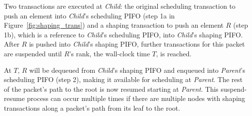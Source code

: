 Two transactions are executed at {\em Child}: the original scheduling
transaction to push an element into {\em Child}'s scheduling PIFO (step 1a
in Figure~\ref{fig:shaping_trans}) and a shaping transaction to push an
element $R$ (step 1b), which is a reference to {\em Child}'s scheduling
PIFO, into {\em Child}'s shaping PIFO. After $R$ is pushed into {\em Child}'s
shaping PIFO, further transactions for this packet are suspended until
$R$'s rank, the wall-clock time $T$, is reached.

At $T$, $R$ will be dequeued from {\em Child}'s shaping PIFO and
enqueued into {\em Parent}'s scheduling PIFO (step 2), making it available
for scheduling at {\em Parent}. The rest of the packet's path to the root is now
resumed starting at {\em Parent}. This suspend-resume process can occur
multiple times if there are multiple nodes with shaping transactions
along a packet's path from its leaf to the root.
